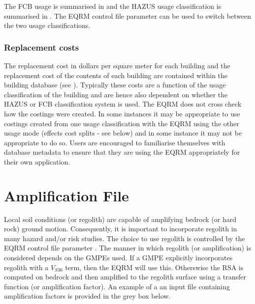 The FCB usage is summarised in
 and the HAZUS usage
classification is summarised in
. The EQRM control file parameter 
 can be used to switch between
the two usage classifications.


\subsubsection{Replacement costs}
\label{sec:grids-replacecosts}


The replacement cost in dollars per square meter for each building
and the replacement cost of the contents of each building are
contained within the building database
(see ).
Typically these costs are a function of the usage classification
of the building and are hence also dependent on whether the
HAZUS or FCB classification system is used. The EQRM does not cross
check how the costings were created. In some instances
it may be appropriate to use costings created from one usage
classification with the EQRM using the other usage mode (effects
cost splits - see below) and in some instance it may not be
appropriate to do so. Users are encouraged to familiarise
themselves with database metadata to ensure that they are using
the EQRM appropriately for their own application.


\clearpage

\section{Amplification File}
\label{sec:-appl-amplification}

Local soil conditions (or regolith) are capable of amplifying 
bedrock (or hard rock) ground motion. Consequently, it is important 
to incorporate regolith in many hazard and/or risk studies. 
The choice to use regolith is controlled by the EQRM control
file parameter . The manner in 
which regolith (or amplification) is considered depends on 
the GMPEs used. If a GMPE explicitly incorporates 
regolith with a $V_{S30}$ term, then the EQRM will use this. 
Otherswise the RSA is computed on bedrock and then amplified 
to the regolith surface using a transfer function (or amplification factor). 
An example of a an input file containing amplification factors is provided in the grey box below. 
 


